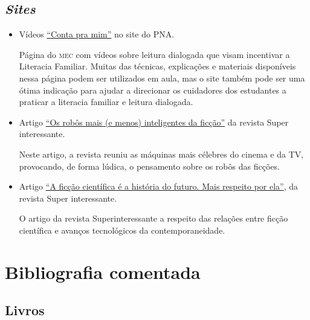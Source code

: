 \documentclass[11pt]{extarticle}
\begin{document}
\subsection{\textit{Sites}}

\begin{itemize}
\item Vídeos \href{http://alfabetizacao.mec.gov.br/contapramim}{“Conta pra mim”} no site do PNA.  

Página do \textsc{mec} com vídeos sobre leitura dialogada que visam incentivar a Literacia Familiar. Muitas das técnicas, explicações e materiais disponíveis nessa página podem ser utilizados em aula, mas o site também pode ser uma ótima indicação para ajudar a direcionar os cuidadores dos estudantes a praticar a literacia familiar e leitura dialogada.

\item Artigo \href{https://super.abril.com.br/cultura/os-robos-mais-e-menos-inteligentes-da-ficcao/}{``Os robôs mais (e menos) inteligentes da ficção''} da revista Super interessante. 

Neste artigo, a revista reuniu as máquinas mais célebres do cinema e da TV, provocando, de forma lúdica, o pensamento sobre os robôs das ficções.

\item Artigo \href{https://super.abril.com.br/ciencia/a-ficcao-cientifica-e-a-historia-do-futuro-mais-respeito-por-ela/}{``A ficção científica é a história do futuro. Mais respeito por ela''}, da revista Super interessante. 

O artigo da revista Superinteressante a respeito das relações entre ficção científica e avanços tecnológicos da contemporaneidade.

\end{itemize}

\section{Bibliografia comentada}

\subsection{Livros}
\end{document}
